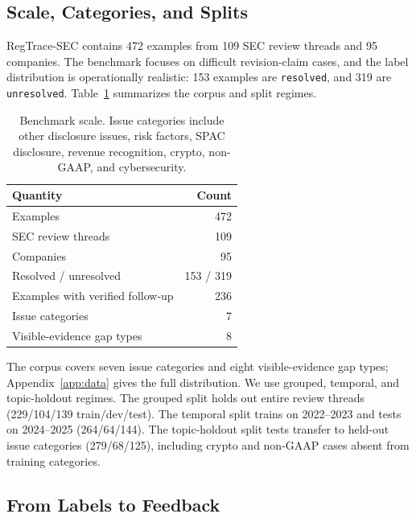 \documentclass[11pt]{article}
\newcommand{\dataset}{RegTrace-SEC}
\begin{document}
\subsection{Scale, Categories, and Splits}

\dataset{} contains 472 examples from 109 SEC review threads and 95 companies. The benchmark focuses on difficult revision-claim cases, and the label distribution is operationally realistic: 153 examples are \texttt{resolved}, and 319 are \texttt{unresolved}. Table~\ref{tab:data} summarizes the corpus and split regimes.

\begin{table}[t]
\centering
\small
\begin{tabular}{lr}
\toprule
\textbf{Quantity} & \textbf{Count} \\
\midrule
Examples & 472 \\
SEC review threads & 109 \\
Companies & 95 \\
Resolved / unresolved & 153 / 319 \\
Examples with verified follow-up & 236 \\
\midrule
Issue categories & 7 \\
Visible-evidence gap types & 8 \\
\bottomrule
\end{tabular}
\caption{Benchmark scale. Issue categories include other disclosure issues, risk factors, SPAC disclosure, revenue recognition, crypto, non-GAAP, and cybersecurity.}
\label{tab:data}
\end{table}

The corpus covers seven issue categories and eight visible-evidence gap types; Appendix~\ref{app:data} gives the full distribution. We use grouped, temporal, and topic-holdout regimes. The grouped split holds out entire review threads (229/104/139 train/dev/test). The temporal split trains on 2022--2023 and tests on 2024--2025 (264/64/144). The topic-holdout split tests transfer to held-out issue categories (279/68/125), including crypto and non-GAAP cases absent from training categories.

\subsection{From Labels to Feedback}
\end{document}
